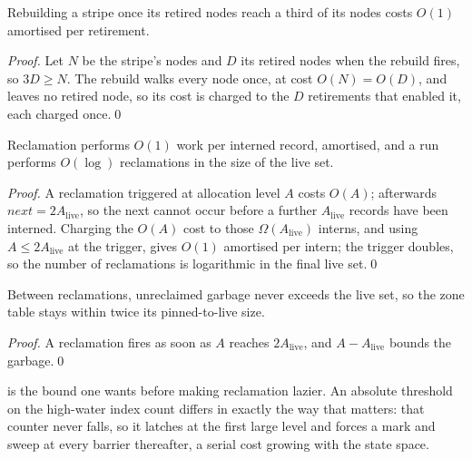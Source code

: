 \begin{proposition}\label{prop:compact}
Rebuilding a stripe once its retired nodes reach a third of its nodes costs
$O(1)$ amortised per retirement.
\end{proposition}
\begin{proof}
Let $N$ be the stripe's nodes and $D$ its retired nodes when the rebuild fires,
so $3D \ge N$.  The rebuild walks every node once, at cost $O(N) = O(D)$, and
leaves no retired node, so its cost is charged to the $D$ retirements that
enabled it, each charged once.\qed
\end{proof}

\begin{proposition}\label{prop:gcamort}
Reclamation performs $O(1)$ work per interned record, amortised, and a run
performs $O(\log)$ reclamations in the size of the live set.
\end{proposition}
\begin{proof}
A reclamation triggered at allocation level $A$ costs $O(A)$; afterwards
$\mathit{next} = 2A_{\mathrm{live}}$, so the next cannot occur before a further
$A_{\mathrm{live}}$ records have been interned.  Charging the $O(A)$ cost to
those $\Omega(A_{\mathrm{live}})$ interns, and using $A \le 2A_{\mathrm{live}}$
at the trigger, gives $O(1)$ amortised per intern; the trigger doubles, so the
number of reclamations is logarithmic in the final live set.\qed
\end{proof}

\begin{proposition}\label{prop:gcmem}
Between reclamations, unreclaimed garbage never exceeds the live set, so the zone
table stays within twice its pinned-to-live size.
\end{proposition}
\begin{proof}
A reclamation fires as soon as $A$ reaches $2A_{\mathrm{live}}$, and $A -
A_{\mathrm{live}}$ bounds the garbage.\qed
\end{proof}

 is the bound one wants before making reclamation lazier.  An
absolute threshold on the high-water index count differs in exactly the way that
matters: that counter never falls, so it latches at the first large level and
forces a mark and sweep at every barrier thereafter, a serial cost growing with
the state space.

